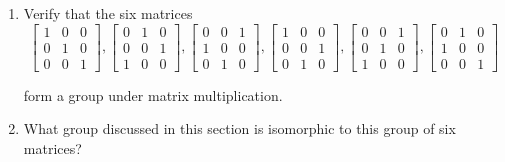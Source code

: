 \begin{exercise}
    \begin{enumerate}[label={\textbf{\alph*.}}]
        \item Verify that the six matrices
              \[
                  \begin{bmatrix}
                      1 & 0 & 0 \\
                      0 & 1 & 0 \\
                      0 & 0 & 1
                  \end{bmatrix},
                  \begin{bmatrix}
                      0 & 1 & 0 \\
                      0 & 0 & 1 \\
                      1 & 0 & 0
                  \end{bmatrix},
                  \begin{bmatrix}
                      0 & 0 & 1 \\
                      1 & 0 & 0 \\
                      0 & 1 & 0
                  \end{bmatrix},
                  \begin{bmatrix}
                      1 & 0 & 0 \\
                      0 & 0 & 1 \\
                      0 & 1 & 0
                  \end{bmatrix},
                  \begin{bmatrix}
                      0 & 0 & 1 \\
                      0 & 1 & 0 \\
                      1 & 0 & 0
                  \end{bmatrix},
                  \begin{bmatrix}
                      0 & 1 & 0 \\
                      1 & 0 & 0 \\
                      0 & 0 & 1
                  \end{bmatrix}
              \]

              form a group under matrix multiplication.
        \item What group discussed in this section is isomorphic to this group of six matrices?
    \end{enumerate}
\end{exercise}

